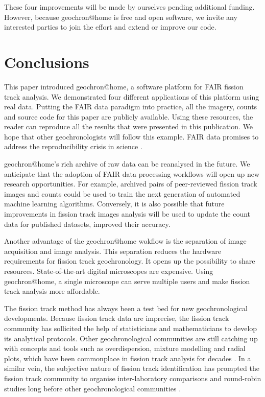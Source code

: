 \documentclass[gchron, manuscript]{copernicus}
\begin{document}
These four improvements will be made by ourselves pending additional
funding. However, because geochron@home is free and open software, we
invite any interested parties to join the effort and extend or improve
our code.

\section{Conclusions}\label{sec:conclusions}

This paper introduced geochron@home, a software platform for
FAIR fission track analysis. We demonstrated four different
applications of this platform using real data. Putting the FAIR data
paradigm into practice, all the imagery, counts and source code for
this paper are publicly available. Using these resources, the reader
can reproduce all the results that were presented in this publication.
We hope that other geochronologists will follow this example.  FAIR
data promises to address the reproducibility crisis in science
\citep{miyakawa2020}.\medskip

geochron@home's rich archive of raw data can be reanalysed in
the future. We anticipate that the adoption of FAIR data processing
workflows will open up new research opportunities. For example,
archived pairs of peer-reviewed fission track images and counts could
be used to train the next generation of automated machine learning
algorithms. Conversely, it is also possible that future improvements
in fission track images analysis will be used to update the count data
for published datasets, improved their accuracy.\medskip

Another advantage of the geochron@home wokflow is the separation of
image acquisition and image analysis. This separation reduces the
hardware requirements for fission track geochronology. It opens up the
possibility to share resources. State-of-the-art digital microscopes
are expensive. Using geochron@home, a single microscope can serve
multiple users and make fission track analysis more
affordable.\medskip

The fission track method has always been a test bed for new
geochronological developments.  Because fission track data are
imprecise, the fission track community has sollicited the help of
statisticians and mathematicians to develop its analytical protocols.
Other geochronological communities are still catching up with concepts
and tools such as overdispersion, mixture modelling and radial plots,
which have been commonplace in fission track analysis for decades
\citep{vermeesch2019b}. In a similar vein, the subjective nature of
fission track identification has prompted the fission track community
to organise inter-laboratory comparisons and round-robin studies long
before other geochronological communities
\citep{miller1985,tamer2025}.\medskip
\end{document}
